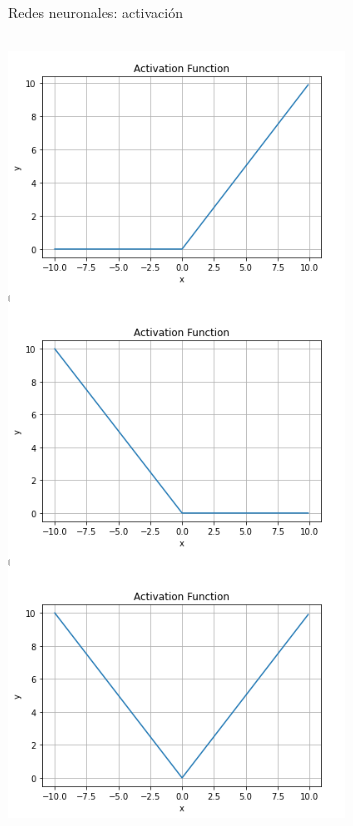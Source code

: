 \begin{frame}{Redes neuronales: activación}
\begin{columns}[c]
\begin{column}{0.3\textwidth}
    \includegraphics[width=\textwidth]{figures/Introduccion/combinolineal.png}
\end{column}
\end{columns}
\end{frame}


